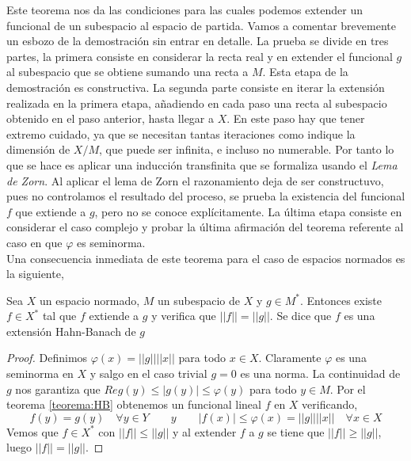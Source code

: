     Este teorema nos da las condiciones para las cuales podemos extender un funcional de un subespacio al espacio de partida. Vamos a comentar brevemente un esbozo de la demostración sin entrar en detalle. La prueba se divide en tres partes, la primera consiste en considerar la recta real y en extender el funcional $g$ al subespacio que se obtiene sumando una recta a $M$. Esta etapa de la demostración es constructiva. La segunda parte consiste en iterar la extensión realizada en la primera etapa, añadiendo en cada paso una recta al subespacio obtenido en el paso anterior, hasta llegar a $X$. En este paso hay que tener extremo cuidado, ya que se necesitan tantas iteraciones como indique la dimensión de $X/M$, que puede ser infinita, e incluso no numerable. Por tanto lo que se hace es aplicar una inducción transfinita que se formaliza usando el \textit{Lema de Zorn}. Al aplicar el lema de Zorn el razonamiento deja de ser constructuvo, pues no controlamos el resultado del proceso, se prueba la existencia del funcional $f$ que extiende a $g$, pero no se conoce explícitamente. La última etapa consiste en considerar el caso complejo y probar la última afirmación del teorema referente al caso en que $\varphi$ es seminorma. \\
    
    Una consecuencia inmediata de este teorema para el caso de espacios normados es la siguiente,
    
    \begin{teorema}\label{teorema:ExtensionHB}
    Sea $X$ un espacio normado, $M$ un subespacio de $X$ y $g \in M^*$. Entonces existe $f \in X^*$ tal que $f$ extiende a $g$ y verifica que $||f|| = ||g||$. Se dice que $f$ es una extensión Hahn-Banach de $g$
    \end{teorema}

    \begin{proof}
        Definimos $\varphi(x) = ||g|| ||x||$ para todo $x \in X$. Claramente $\varphi$ es una seminorma en $X$ y salgo en el caso trivial $g=0$ es una norma. La continuidad de $g$ nos garantiza que $Re g(y) \leq |g(y)| \leq \varphi(y)$ para todo $y \in M$. Por el teorema \ref{teorema:HB} obtenemos un funcional lineal $f$ en $X$ verificando,
        \begin{equation}
            f(y) = g(y) \quad \forall y \in Y \qquad y \qquad |f(x)| \leq \varphi(x) = ||g|| ||x|| \quad \forall x \in X
        \end{equation}
        \noindent Vemos que $f \in X^*$ con $||f|| \leq ||g||$ y al extender $f$ a $g$ se tiene que $||f|| \geq ||g||$, luego $||f|| = ||g||$.
    \end{proof}
    
